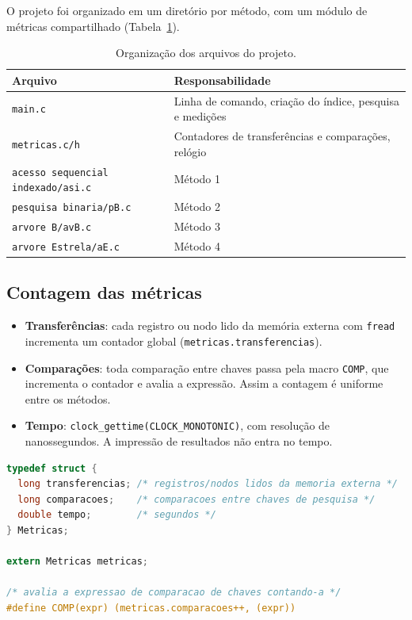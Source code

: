\documentclass{article}
\begin{document}
O projeto foi organizado em um diretório por método, com um módulo de métricas compartilhado (Tabela~\ref{tab:arquivos}).

\begin{table}[!htb]
    \centering
    \begin{tabular}{|l|l|}
        \hline\hline
        Arquivo & Responsabilidade \\\hline
        \texttt{main.c} & Linha de comando, criação do índice, pesquisa e medições \\
        \texttt{metricas.c/h} & Contadores de transferências e comparações, relógio \\
        \texttt{acesso sequencial indexado/asi.c} & Método 1 \\
        \texttt{pesquisa binaria/pB.c} & Método 2 \\
        \texttt{arvore B/avB.c} & Método 3 \\
        \texttt{arvore Estrela/aE.c} & Método 4 \\\hline\hline
    \end{tabular}
    \caption{\label{tab:arquivos}Organização dos arquivos do projeto.}
\end{table}

\subsection{Contagem das métricas}

\begin{itemize}
    \item \textbf{Transferências}: cada registro ou nodo lido da memória externa com \texttt{fread} incrementa um contador global (\texttt{metricas.transferencias}).
    \item \textbf{Comparações}: toda comparação entre chaves passa pela macro \texttt{COMP}, que incrementa o contador e avalia a expressão. Assim a contagem é uniforme entre os métodos.
    \item \textbf{Tempo}: \texttt{clock\_gettime(CLOCK\_MONOTONIC)}, com resolução de nanossegundos. A impressão de resultados não entra no tempo.
\end{itemize}

\begin{lstlisting}[caption={Estrutura de métricas e macro de contagem (metricas.h).},label={lst:metricas},language=C]
typedef struct {
  long transferencias; /* registros/nodos lidos da memoria externa */
  long comparacoes;    /* comparacoes entre chaves de pesquisa */
  double tempo;        /* segundos */
} Metricas;

extern Metricas metricas;

/* avalia a expressao de comparacao de chaves contando-a */
#define COMP(expr) (metricas.comparacoes++, (expr))
\end{lstlisting}
\end{document}
